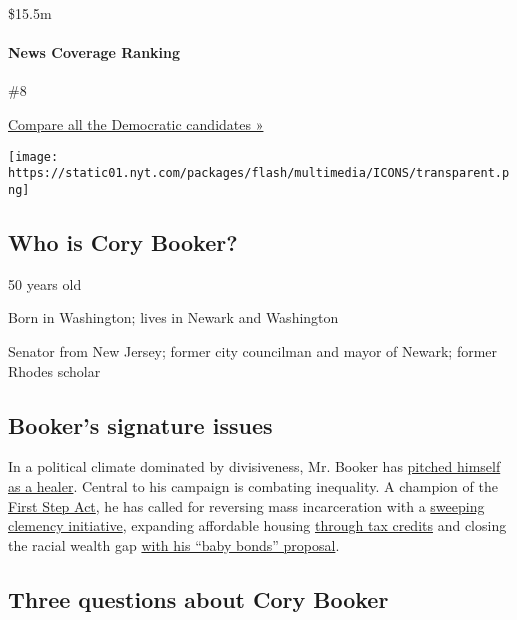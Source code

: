 \$15.5m

\hypertarget{news-coverage-ranking}{%
\paragraph{News Coverage Ranking}\label{news-coverage-ranking}}

\#8

\href{https://www.nytimes.com/interactive/2020/us/elections/democratic-polls.html}{Compare
all the Democratic candidates »}

\texttt{[image: https://static01.nyt.com/packages/flash/multimedia/ICONS/transparent.png]}

\hypertarget{who-is-cory-booker}{%
\subsection{Who is Cory Booker?}\label{who-is-cory-booker}}

50 years old

Born in Washington; lives in Newark and Washington

Senator from New Jersey; former city councilman and mayor of Newark;
former Rhodes scholar

\hypertarget{bookers-signature-issues}{%
\subsection{Booker's signature issues}\label{bookers-signature-issues}}

In a political climate dominated by divisiveness, Mr. Booker has
\href{https://www.nytimes.com/2019/02/01/us/politics/cory-booker-2020.html}{pitched
himself as a healer}. Central to his campaign is combating inequality. A
champion of the
\href{https://www.nytimes.com/2018/12/18/us/politics/senate-criminal-justice-bill.html}{First
Step Act}, he has called for reversing mass incarceration with a
\href{https://www.nytimes.com/2019/06/20/us/politics/booker-drugs-clemency.html?rref=collection\%2Fbyline\%2Fnick-corasaniti\&action=click\&contentCollection=undefined\&region=stream\&module=stream_unit\&version=latest\&contentPlacement=9\&pgtype=collection}{sweeping
clemency initiative}, expanding affordable housing
\href{https://www.nytimes.com/2019/06/05/us/politics/booker-renters-credit.html}{through
tax credits} and closing the racial wealth gap
\href{https://www.nytimes.com/2019/04/06/us/politics/cory-booker-2020-baby-bonds.html}{with
his ``baby bonds'' proposal}.

\hypertarget{three-questions-about-cory-booker}{%
\subsection{Three questions about Cory
Booker}\label{three-questions-about-cory-booker}}

